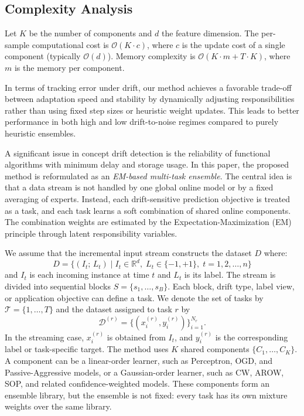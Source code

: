 \documentclass[12pt,a4paper]{article}
\begin{document}
\subsection{Complexity Analysis}

Let $K$ be the number of components and $d$ the feature dimension. The per-sample computational cost is $\mathcal{O}(K \cdot c)$, where $c$ is the update cost of a single component (typically $\mathcal{O}(d)$). Memory complexity is $\mathcal{O}(K \cdot m + T \cdot K)$, where $m$ is the memory per component.

In terms of tracking error under drift, our method achieves a favorable trade-off between adaptation speed and stability by dynamically adjusting responsibilities rather than using fixed step sizes or heuristic weight updates. This leads to better performance in both high and low drift-to-noise regimes compared to purely heuristic ensembles.









	
	
	
	
	A significant issue in concept drift detection is the reliability of functional algorithms with minimum delay and storage usage. In this paper, the proposed method is reformulated as an \textit{EM-based multi-task ensemble}. The central idea is that a data stream is not handled by one global online model or by a fixed averaging of experts. Instead, each drift-sensitive prediction objective is treated as a task, and each task learns a soft combination of shared online components. The combination weights are estimated by the Expectation-Maximization (EM) principle through latent responsibility variables.
	
	We assume that the incremental input stream constructs the dataset $D$ where:
	\[
	D = \{(I_t;\, L_t) \mid I_t \in \mathbb{R}^d,\; L_t \in \{-1, +1\},\; t = 1, 2, \ldots, n\}
	\]
	and $I_t$ is each incoming instance at time $t$ and $L_t$ is its label. The stream is divided into sequential blocks $S=\{s_1,\ldots,s_B\}$. Each block, drift type, label view, or application objective can define a task. We denote the set of tasks by $\mathcal{T}=\{1,\ldots,T\}$ and the dataset assigned to task $r$ by
	\[
	\mathcal{D}^{(r)}=\{(x_i^{(r)},y_i^{(r)})\}_{i=1}^{N_r}.
	\]
	In the streaming case, $x_i^{(r)}$ is obtained from $I_t$, and $y_i^{(r)}$ is the corresponding label or task-specific target. The method uses $K$ shared components $\{C_1,\ldots,C_K\}$. A component can be a linear-order learner, such as Perceptron, OGD, and Passive-Aggressive models, or a Gaussian-order learner, such as CW, AROW, SOP, and related confidence-weighted models. These components form an ensemble library, but the ensemble is not fixed: every task has its own mixture weights over the same library.
	
\end{document}
